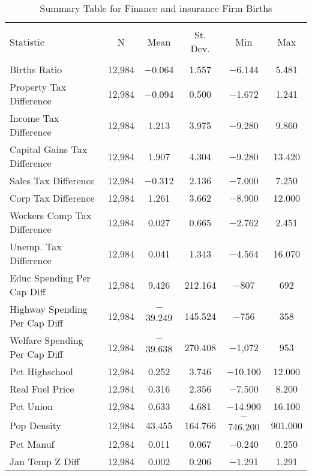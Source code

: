 
\begin{table}[!htbp] \centering 
  \caption{Summary Table for  Finance and insurance Firm Births} 
  \label{52summary} 
\begin{tabular}{@{\extracolsep{5pt}}lccccc} 
\\[-1.8ex]\hline 
\hline \\[-1.8ex] 
Statistic & \multicolumn{1}{c}{N} & \multicolumn{1}{c}{Mean} & \multicolumn{1}{c}{St. Dev.} & \multicolumn{1}{c}{Min} & \multicolumn{1}{c}{Max} \\ 
\hline \\[-1.8ex] 
Births Ratio & 12,984 & $-$0.064 & 1.557 & $-$6.144 & 5.481 \\ 
Property Tax Difference & 12,984 & $-$0.094 & 0.500 & $-$1.672 & 1.241 \\ 
Income Tax Difference & 12,984 & 1.213 & 3.975 & $-$9.280 & 9.860 \\ 
Capital Gains Tax Difference & 12,984 & 1.907 & 4.304 & $-$9.280 & 13.420 \\ 
Sales Tax Difference & 12,984 & $-$0.312 & 2.136 & $-$7.000 & 7.250 \\ 
Corp Tax Difference & 12,984 & 1.261 & 3.662 & $-$8.900 & 12.000 \\ 
Workers Comp Tax Difference & 12,984 & 0.027 & 0.665 & $-$2.762 & 2.451 \\ 
Unemp. Tax Difference & 12,984 & 0.041 & 1.343 & $-$4.564 & 16.070 \\ 
Educ Spending Per Cap Diff & 12,984 & 9.426 & 212.164 & $-$807 & 692 \\ 
Highway Spending Per Cap Diff & 12,984 & $-$39.249 & 145.524 & $-$756 & 358 \\ 
Welfare Spending Per Cap Diff & 12,984 & $-$39.638 & 270.408 & $-$1,072 & 953 \\ 
Pct Highschool & 12,984 & 0.252 & 3.746 & $-$10.100 & 12.000 \\ 
Real Fuel Price & 12,984 & 0.316 & 2.356 & $-$7.500 & 8.200 \\ 
Pct Union & 12,984 & 0.633 & 4.681 & $-$14.900 & 16.100 \\ 
Pop Density & 12,984 & 43.455 & 164.766 & $-$746.200 & 901.000 \\ 
Pct Manuf & 12,984 & 0.011 & 0.067 & $-$0.240 & 0.250 \\ 
Jan Temp Z Diff & 12,984 & 0.002 & 0.206 & $-$1.291 & 1.291 \\ 

\end{tabular}
\end{table}
